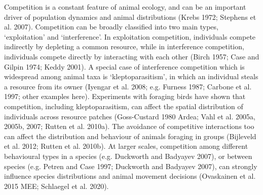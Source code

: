 \documentclass[11pt]{article}
\begin{document}
Competition is a constant feature of animal ecology, and can be an important driver of population dynamics and animal distributions (Krebs 1972; Stephens et al. 2007).
Competition can be broadly classified into two main types, `exploitation' and `interference'. 
In exploitation competition, individuals compete indirectly by depleting a common resource, while in interference competition, individuals compete directly by interacting with each other (Birch 1957; Case and Gilpin 1974; Keddy 2001).
A special case of interference competition which is widespread among animal taxa is `kleptoparasitism', in which an individual steals a resource from its owner (Iyengar et al. 2008; e.g. Furness 1987; Carbone et al. 1997; other examples here).
Experiments with foraging birds have shown that competition, including kleptoparasitism, can affect the spatial distribution of individuals across resource patches (Goss-Custard 1980 Ardea; Vahl et al. 2005a, 2005b, 2007; Rutten et al. 2010a).
The avoidance of competitive interactions too can affect the distribution and behaviour of animals foraging in groups (Bijleveld et al. 2012; Rutten et al. 2010b).
At larger scales, competition among different behavioural types in a species (e.g. Duckworth and Badyayev 2007), or between species (e.g. Petren and Case 1997; Duckworth and Badyayev 2007), can strongly influence species distributions and animal movement decisions (Ovaskainen et al. 2015 MEE; Schlaegel et al. 2020).
\end{document}
